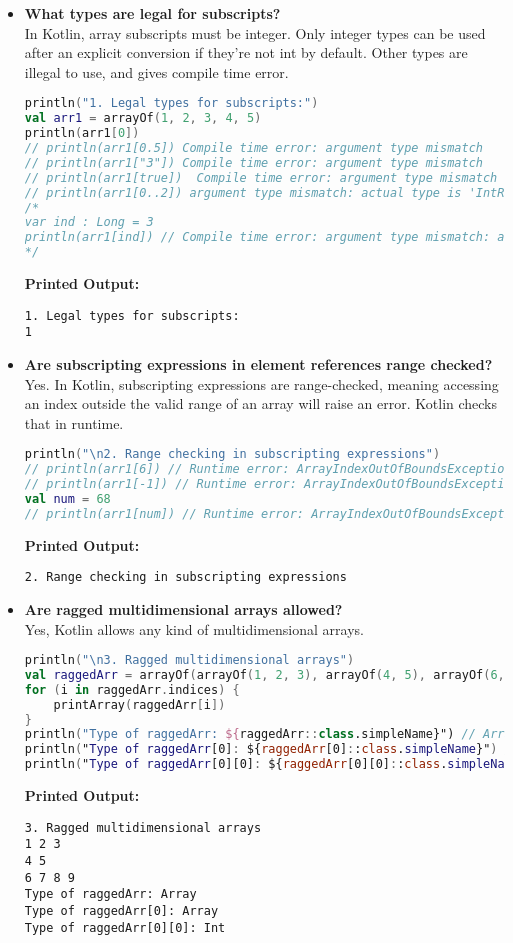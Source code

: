 \documentclass{article}
\begin{document}
\begin{itemize}
\item \textbf{What types are legal for subscripts?} \\
In Kotlin, array subscripts must be integer. Only integer types can be used after an explicit conversion if they’re not int by default. Other types are illegal to use, and gives compile time error. 
\begin{lstlisting}[language=Kotlin]
println("1. Legal types for subscripts:")
val arr1 = arrayOf(1, 2, 3, 4, 5)
println(arr1[0])
// println(arr1[0.5]) Compile time error: argument type mismatch
// println(arr1["3"]) Compile time error: argument type mismatch
// println(arr1[true])  Compile time error: argument type mismatch
// println(arr1[0..2]) argument type mismatch: actual type is 'IntRange', but 'Int' was expected.
/*
var ind : Long = 3
println(arr1[ind]) // Compile time error: argument type mismatch: actual type is 'Long', but 'Int' was expected.
*/
\end{lstlisting}
\textbf{Printed Output:}
\begin{verbatim}
1. Legal types for subscripts:
1
\end{verbatim}


\item \textbf{Are subscripting expressions in element references range checked?} \\
Yes. In Kotlin, subscripting expressions are range-checked, meaning accessing an index outside the
valid range of an array will raise an error. Kotlin checks that in runtime.
\begin{lstlisting}[language=Kotlin] 
println("\n2. Range checking in subscripting expressions")
// println(arr1[6]) // Runtime error: ArrayIndexOutOfBoundsException
// println(arr1[-1]) // Runtime error: ArrayIndexOutOfBoundsException
val num = 68
// println(arr1[num]) // Runtime error: ArrayIndexOutOfBoundsException.
\end{lstlisting}
\textbf{Printed Output:}
\begin{verbatim}
2. Range checking in subscripting expressions
\end{verbatim}


\item \textbf{Are ragged multidimensional arrays allowed?} \\
Yes, Kotlin allows any kind of multidimensional arrays.
\begin{lstlisting}[language=Kotlin]
println("\n3. Ragged multidimensional arrays")
val raggedArr = arrayOf(arrayOf(1, 2, 3), arrayOf(4, 5), arrayOf(6, 7, 8, 9))
for (i in raggedArr.indices) {
    printArray(raggedArr[i]) 
}
println("Type of raggedArr: ${raggedArr::class.simpleName}") // Array<Array<Int>>
println("Type of raggedArr[0]: ${raggedArr[0]::class.simpleName}") // Array<Int>
println("Type of raggedArr[0][0]: ${raggedArr[0][0]::class.simpleName}") // Int
\end{lstlisting}
\textbf{Printed Output:}
\begin{verbatim}
3. Ragged multidimensional arrays
1 2 3 
4 5 
6 7 8 9 
Type of raggedArr: Array
Type of raggedArr[0]: Array
Type of raggedArr[0][0]: Int
\end{verbatim}




\end{itemize}
\end{document}

